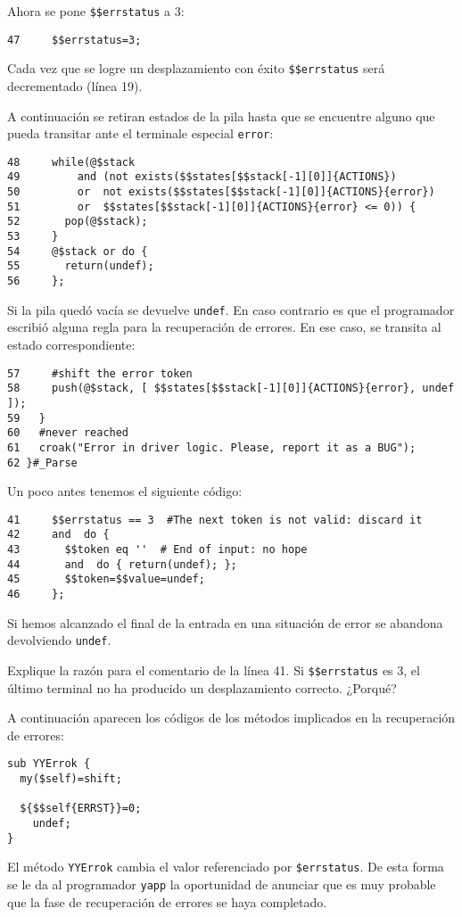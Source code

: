 Ahora se pone \verb|$$errstatus| a 3:
\begin{verbatim}
47     $$errstatus=3;
\end{verbatim}
Cada vez que se logre un desplazamiento con éxito \verb|$$errstatus|
será decrementado (línea 19).

A continuación se retiran estados de la pila hasta
que se encuentre alguno que pueda transitar ante el 
terminale especial \verb|error|:
\begin{verbatim}
48     while(@$stack
49         and (not exists($$states[$$stack[-1][0]]{ACTIONS})
50         or  not exists($$states[$$stack[-1][0]]{ACTIONS}{error})
51         or  $$states[$$stack[-1][0]]{ACTIONS}{error} <= 0)) {
52       pop(@$stack);
53     }
54     @$stack or do {
55       return(undef);
56     };
\end{verbatim}
Si la pila quedó vacía se devuelve \verb|undef|. En caso contrario
es que el programador escribió alguna regla para la
recuperación de errores. En ese caso, se transita al estado
correspondiente:
\begin{verbatim}
57     #shift the error token
58     push(@$stack, [ $$states[$$stack[-1][0]]{ACTIONS}{error}, undef ]);
59   }
60   #never reached
61   croak("Error in driver logic. Please, report it as a BUG");
62 }#_Parse
\end{verbatim}
Un poco antes tenemos el siguiente código:
\begin{verbatim}
41     $$errstatus == 3  #The next token is not valid: discard it
42     and  do {
43       $$token eq ''  # End of input: no hope
44       and  do { return(undef); }; 
45       $$token=$$value=undef;
46     };
\end{verbatim}
Si hemos alcanzado el final de la entrada en una situación de error
se abandona devolviendo \verb|undef|.
\begin{exercise}
Explique la razón para el comentario de la línea
41. Si \verb|$$errstatus| es 3, el último
terminal no ha producido un desplazamiento correcto. ¿Porqué?
\end{exercise}
A continuación aparecen los códigos de los métodos implicados en 
la recuperación de errores:
\begin{verbatim}
sub YYErrok {
  my($self)=shift;

  ${$$self{ERRST}}=0;
    undef;
}
\end{verbatim}
El método \verb|YYErrok| cambia el valor referenciado por \verb|$errstatus|.
De esta forma se le da al programador \verb|yapp| la oportunidad de anunciar
que es muy probable que la fase de recuperación de errores se haya completado.

